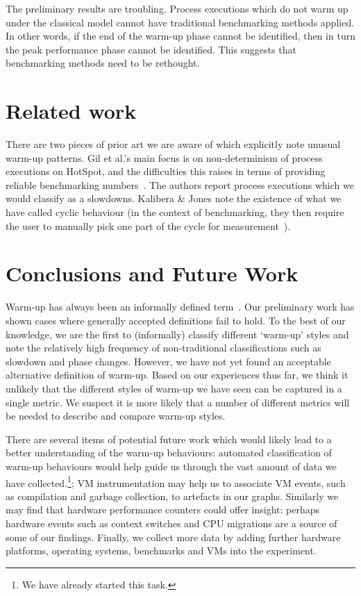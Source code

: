 \documentclass[preprint]{sigplanconf}
\newcommand{\kalibera}{Kalibera \& Jones\xspace}
\begin{document}
The preliminary results are troubling. Process executions which do not warm up
under the classical model cannot have traditional benchmarking methods
applied. In other words, if the end of the warm-up phase cannot be identified,
then in turn the peak performance phase cannot be identified. This suggests
that benchmarking methods need to be rethought.


\section{Related work}

There are two pieces of prior art we are aware of which explicitly note unusual warm-up
patterns. Gil et al.'s main focus is on non-determinism of process executions on
HotSpot, and the difficulties this raises in terms of providing reliable
benchmarking numbers~\cite{gil11microbenchmark}. The authors report
process executions which we would classify as a slowdowns. \kalibera note the
existence of what we have called cyclic behaviour (in the context of benchmarking,
they then require the user to
manually pick one part of the cycle for measurement~\cite{kalibera13rigorous}).

\section{Conclusions and Future Work}
\label{sec:conclusion}

Warm-up has always been an informally defined term~\cite{seaton15phd}. Our
preliminary work has shown cases where generally accepted definitions fail to hold.
To the best of our knowledge, we are the first to (informally) classify different
`warm-up' styles and note the relatively high frequency of non-traditional
classifications such as slowdown and phase changes.
However, we have not yet found an acceptable alternative definition of warm-up.
Based on our experiences thus far, we think it unlikely that the different
styles of warm-up we have seen can be captured in a single metric. We suspect it
is more likely that a number of different metrics will be needed to describe and
compare warm-up styles.

There are several items of potential future work which would likely lead to a
better understanding of the warm-up behaviours: automated classification of
warm-up behaviours would help guide us through the vast amount of data we have
collected.\footnote{We have already started this task.}; VM instrumentation may
help us to associate VM events, such as compilation and garbage collection, to
artefacts in our graphs. Similarly we may find that hardware performance
counters could offer insight: perhaps hardware events such as context
switches and CPU migrations are a source of some of our findings. Finally, we
collect more data by adding further hardware platforms, operating systems,
benchmarks and VMs into the experiment.
\end{document}

